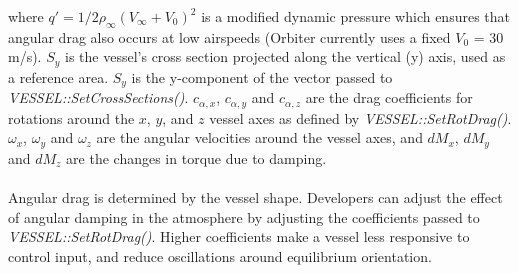 \documentclass[Orbiter Developer Manual.tex]{subfiles}
\begin{document}
\noindent
where $q' = 1/2 \rho_{\infty}(V_{\infty} + V_{0})^{2}$ is a modified dynamic pressure which ensures that angular drag also occurs at low airspeeds (Orbiter currently uses a fixed $V_{0}$ = 30 m/s). $S_{y}$ is the vessel's cross section projected along the vertical (y) axis, used as a reference area. $S_{y}$ is the y-component of the vector passed to \textit{VESSEL::SetCrossSections()}. $c_{\alpha,x}$, $c_{\alpha,y}$ and $c_{\alpha,z}$ are the drag coefficients for rotations around the $x$, $y$, and $z$ vessel axes as defined by \textit{VESSEL::SetRotDrag()}. $\omega_{x}$, $\omega_{y}$ and $\omega_{z}$ are the angular velocities around the vessel axes, and $dM_{x}$, $dM_{y}$ and $dM_{z}$ are the changes in torque due to damping.\\
\\
Angular drag is determined by the vessel shape. Developers can adjust the effect of angular damping in the atmosphere by adjusting the coefficients passed to \textit{VESSEL::SetRotDrag()}. Higher coefficients make a vessel less responsive to control input, and reduce oscillations around equilibrium orientation.
\end{document}
